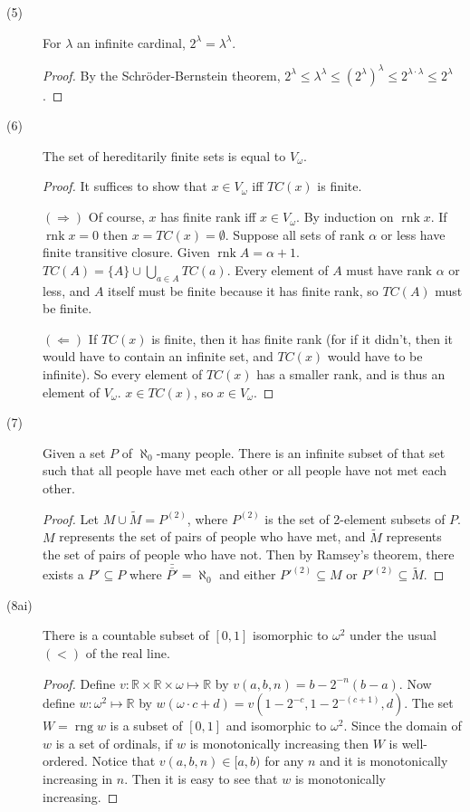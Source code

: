 \documentclass[12pt]{article}
\DeclareMathOperator{\rnk}{rnk}
\DeclareMathOperator{\rng}{rng}
\newcommand{\card}[1]{\bar{\bar{#1}}}
\begin{document}
\begin{description}
\item[(5)]
  For $\lambda$ an infinite cardinal, $2^\lambda = \lambda^\lambda$.
  \begin{proof}
    By the Schr\"oder-Bernstein theorem, $2^\lambda \le \lambda^\lambda
	\le (2^\lambda)^\lambda \le 2^{\lambda \cdot \lambda} \le
	2^\lambda$.
  \end{proof}

\item[(6)]
  The set of hereditarily finite sets is equal to $V_\omega$.
  \begin{proof}	
    It suffices to show that $x \in V_\omega$ iff $TC(x)$ is finite.

	$(\Rightarrow)$ Of course, $x$ has finite rank iff $x \in V_\omega$.
	By induction on $\rnk{x}$.  If $\rnk{x} = 0$ then $x = TC(x) =
	\emptyset$.  Suppose all sets of rank $\alpha$ or less have finite
	transitive closure.  Given $\rnk{A} = \alpha+1$.  $TC(A) = \{A\}
	\cup \bigcup\limits_{a \in A}{TC(a)}$.  Every element of $A$ must
	have rank $\alpha$ or less, and $A$ itself must be finite because it
	has finite rank, so $TC(A)$ must be finite.

	$(\Leftarrow)$ If $TC(x)$ is finite, then it has finite rank (for if
	it didn't, then it would have to contain an infinite set, and
	$TC(x)$ would have to be infinite).  So every element of $TC(x)$ has
	a smaller rank, and is thus an element of $V_\omega$.  $x \in
	TC(x)$, so $x \in V_\omega$.
  \end{proof}

\item[(7)]
  Given a set $P$ of $\aleph_0$-many people.  There is an infinite
  subset of that set such that all people have met each other or all
  people have not met each other.
  \begin{proof}
	Let $M \cup \tilde{M} = P^{(2)}$, where $P^{(2)}$ is the set of
	2-element subsets of $P$.  $M$ represents the set of pairs of people
	who have met, and $\tilde{M}$ represents the set of pairs of people
	who have not.  Then by Ramsey's theorem, there exists a $P'
	\subseteq P$ where $\card{P'} = \aleph_0$ and either $P'^{(2)}
	\subseteq M$ or $P'^{(2)} \subseteq \tilde{M}$.
  \end{proof}

\item[(8ai)]
  There is a countable subset of $[0,1]$ isomorphic to $\omega^2$ under
  the usual $(<)$ of the real line.
  \begin{proof}
    Define $v: \mathbb{R} \times \mathbb{R} \times \omega \mapsto
	\mathbb{R}$ by $v(a,b,n) = b - 2^{-n}(b-a)$.  Now define $w:
	\omega^2 \mapsto \mathbb{R}$ by $w(\omega \cdot c + d) = v(1 -
	2^{-c}, 1 - 2^{-(c+1)}, d)$.  The set $W = \rng{w}$ is a subset of
	$[0,1]$ and isomorphic to $\omega^2$.  Since the domain of $w$ is a
	set of ordinals, if $w$ is monotonically increasing then $W$ is
	well-ordered.  Notice that $v(a,b,n) \in [a,b)$ for any $n$ and it
	is monotonically increasing in $n$.  Then it is easy to see that $w$
	is monotonically increasing.
  \end{proof}


\end{description}
\end{document}

